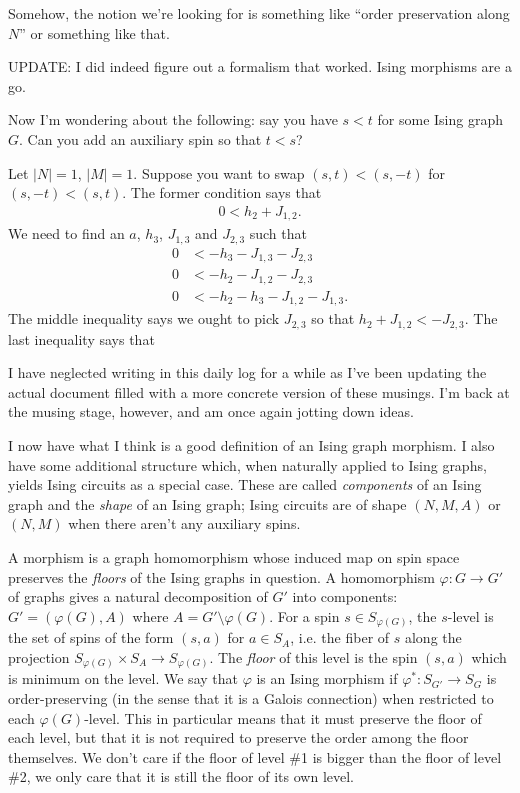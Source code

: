 Somehow, the notion we're looking for is something like ``order preservation along $N$'' or something like that.

UPDATE: I did indeed figure out a formalism that worked. Ising morphisms are a go.

Now I'm wondering about the following: say you have $s < t$ for some Ising graph $G$. Can you add an auxiliary spin so that $t < s$?

\begin{example}\label{ex:swap-relation-low-value}
	Let $|N| = 1$, $|M| = 1$. Suppose you want to swap $(s,t) < (s,-t)$ for $(s,-t) < (s,t)$. The former condition says that
	\begin{align*}
		0 < h_2 + J_{1,2}.
	\end{align*}
	We need to find an $a$, $h_3$, $J_{1,3}$ and $J_{2,3}$ such that
	\begin{align*}
		0 &< -h_{3} -J_{1,3} -J_{2,3} \\
		0 &< -h_{2} -J_{1,2} -J_{2,3} \\
		0 &< -h_{2} -h_{3} -J_{1,2} -J_{1,3}.
	\end{align*}
	The middle inequality says we ought to pick $J_{2,3}$ so that $h_2 + J_{1,2} < -J_{2,3}$. The last inequality says that
\end{example}

I have neglected writing in this daily log for a while as I've been updating the actual document filled with a more concrete version of these musings. I'm back at the musing stage, however, and am once again jotting down ideas.

I now have what I think is a good definition of an Ising graph morphism. I also have some additional structure which, when naturally applied to Ising graphs, yields Ising circuits as a special case. These are called \emph{components} of an Ising graph and the \emph{shape} of an Ising graph; Ising circuits are of shape $(N,M,A)$ or $(N,M)$ when there aren't any auxiliary spins.

A morphism is a graph homomorphism whose induced map on spin space preserves the \emph{floors} of the Ising graphs in question. A homomorphism $\varphi:G \to G'$ of graphs gives a natural decomposition of $G'$ into components: $G' = (\varphi(G),A)$ where $A = G' \setminus \varphi(G)$. For a spin $s \in S_{\varphi(G)}$, the $s$-level is the set of spins of the form $(s,a)$ for $a \in S_A$, i.e. the fiber of $s$ along the projection $S_{\varphi(G)}\times S_A \to S_{\varphi(G)}$. The \emph{floor} of this level is the spin $(s,a)$ which is minimum on the level. We say that $\varphi$ is an Ising morphism if $\varphi^*:S_{G'} \to S_G$ is order-preserving (in the sense that it is a Galois connection) when restricted to each $\varphi(G)$-level. This in particular means that it must preserve the floor of each level, but that it is not required to preserve the order among the floor themselves. We don't care if the floor of level \#1 is bigger than the floor of level \#2, we only care that it is still the floor of its own level.

